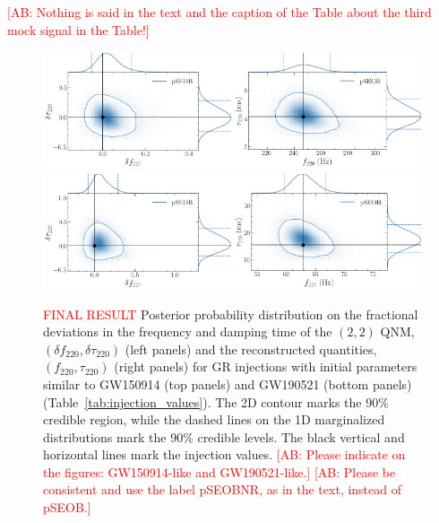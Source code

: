 \documentclass[twocolumn,prd,aps,superscriptaddress,preprintnumbers,tightenlines,showpacs,nofootinbib,eqsecnum,amsfonts,amsmath]{revtex4-1}
\newcommand{\comment}[1]{\textcolor{red}{[#1]}}
\newcommand{\df}[1]{\delta f_{\text{#1}}}
\newcommand{\dtau}[1]{\delta \tau_{\text{#1}}}
\newcommand{\fngr}[1]{f_{\text{#1}}}
\newcommand{\taungr}[1]{\tau_{\text{#1}}}
\begin{document}
\comment{AB: Nothing is said in the text and the caption of the Table about the third mock signal in the Table!}

\begin{figure}[hbt]
\begin{center}
	\includegraphics[width=0.5\textwidth]{figures/GW150914_simulated_signal_0p0_deltaf220_deltatau220.png}\includegraphics[width=0.5\textwidth]{figures/GW150914_simulated_signal_0p0_f220_tau220.png}	
	\includegraphics[width=0.5\textwidth]{figures/GW190521_simulated_signal_0p0_deltaf220_deltatau220.png}\includegraphics[width=0.5\textwidth]{figures/GW190521_simulated_signal_0p0_f220_tau220.png}		
	\caption{\textcolor{red}{FINAL RESULT} Posterior probability distribution on the fractional deviations in the frequency and damping time of the $(2,2)$ QNM, $(\df{220},\dtau{220})$ (left panels) and the reconstructed quantities, $(\fngr{220}, \taungr{220})$ (right panels) for GR injections with initial parameters similar to GW150914 (top panels) and GW190521 (bottom panels) (Table~\ref{tab:injection_values}). The 2D contour marks the 90\% credible region, while the dashed lines on the 1D marginalized distributions mark the 90\% credible levels. The black vertical and horizontal lines mark the injection values. \comment{AB: Please indicate on the figures: GW150914-like and GW190521-like.} \comment{AB: Please be consistent and use the label pSEOBNR, as in the text, instead of pSEOB.}}

\end{center}
\end{figure}
\end{document}
